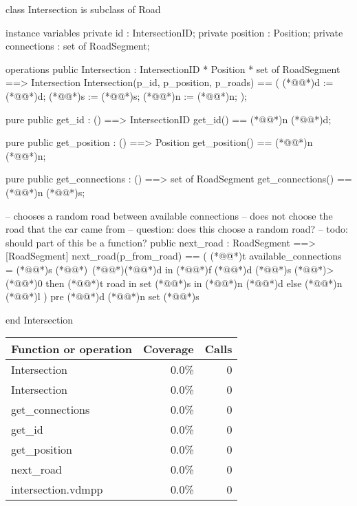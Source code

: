\documentclass[a4paper]{article}
\begin{document}
\title{}
\author{}
\begin{vdm_al}
class Intersection is subclass of Road

instance variables
    private id : IntersectionID;
    private position : Position;
    private connections : set of RoadSegment;

operations
    public Intersection : IntersectionID * Position * set of RoadSegment ==> Intersection
    Intersection(p_id, p_position, p_roads) == (
        (*@@*)d := (*@@*)d;
        (*@@*)s := (*@@*)s;
        (*@@*)n := (*@@*)n;
    );

    pure public get_id : () ==> IntersectionID
    get_id() == (*@@*)n (*@@*)d;

    pure public get_position : () ==> Position
    get_position() == (*@@*)n (*@@*)n;

    pure public get_connections : () ==> set of RoadSegment
    get_connections() == (*@@*)n (*@@*)s;

    -- chooses a random road between available connections
    -- does not choose the road that the car came from
    -- question: does this choose a random road?
    -- todo: should part of this be a function?
    public next_road : RoadSegment ==> [RoadSegment]
    next_road(p_from_road) == (
        (*@@*)t available_connections = (*@@*)s (*@\vdmnotcovered{}@*)\ (*@\vdmnotcovered{}@*){(*@@*)d} in
            (*@@*)f (*@@*)d (*@@*)s (*@\vdmnotcovered{<}@*)> (*@\vdmnotcovered{}@*)0 then
                (*@@*)t road in set (*@@*)s in
                    (*@@*)n (*@@*)d
            else (*@@*)n (*@@*)l
    )
    pre (*@@*)d (*@@*)n set (*@@*)s

end Intersection
\end{vdm_al}
\bigskip
\begin{longtable}{|l|r|r|}
\hline
Function or operation & Coverage & Calls \\
\hline
\hline
Intersection & 0.0\% & 0 \\
\hline
Intersection & 0.0\% & 0 \\
\hline
get\_connections & 0.0\% & 0 \\
\hline
get\_id & 0.0\% & 0 \\
\hline
get\_position & 0.0\% & 0 \\
\hline
next\_road & 0.0\% & 0 \\
\hline
\hline
intersection.vdmpp & 0.0\% & 0 \\
\hline
\end{longtable}
\end{document}
